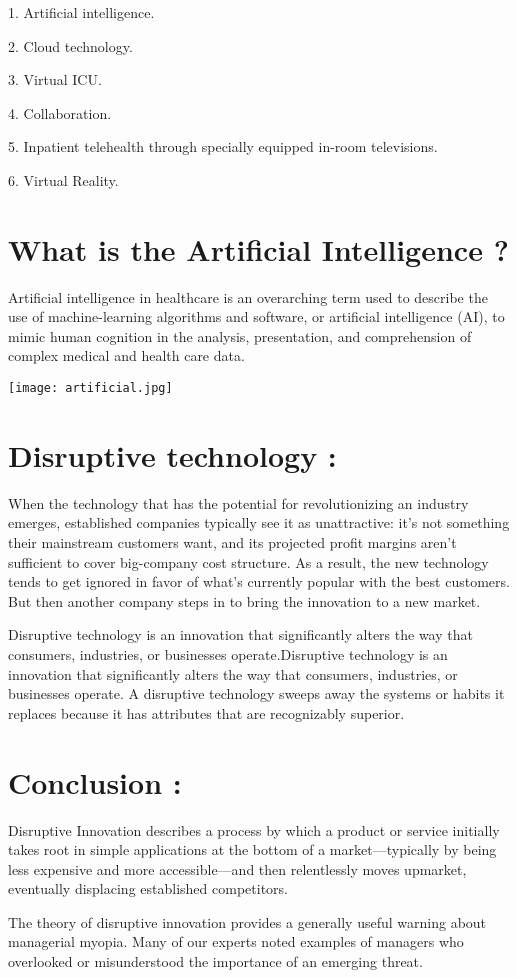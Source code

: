 \documentclass[12pt]{article}
\begin{document}
 1. Artificial intelligence.
 
 
 2. Cloud technology.
 
 
 3. Virtual ICU.
 
 
 4. Collaboration.
 
 
 5. Inpatient telehealth through specially equipped in-room televisions.
 
 
 6. Virtual Reality.
 
\section*{What is the Artificial Intelligence ?}
Artificial intelligence in healthcare is an overarching term used to describe the use of machine-learning algorithms and software, or artificial intelligence (AI), to mimic human cognition in the analysis, presentation, and comprehension of complex medical and health care data.

\centering
\texttt{[image: artificial.jpg]}

\section*{Disruptive technology :}
When the technology that has the potential for revolutionizing an industry emerges, established companies typically see it as unattractive: it’s not something their mainstream customers want, and its projected profit margins aren’t sufficient to cover big-company cost structure. As a result, the new technology tends to get ignored in favor of what’s currently popular with the best customers. But then another company steps in to bring the innovation to a new market.


Disruptive technology is an innovation that significantly alters the way that consumers, industries, or businesses operate.Disruptive technology is an innovation that significantly alters the way that consumers, industries, or businesses operate. A disruptive technology sweeps away the systems or habits it replaces because it has attributes that are recognizably superior.

\section*{Conclusion :}
Disruptive Innovation describes a process by which a product or service initially takes root in simple applications at the bottom of a market—typically by being less expensive and more accessible—and then relentlessly moves upmarket, eventually displacing established competitors.

The theory of disruptive innovation provides a generally useful warning about managerial myopia. Many of our experts noted examples of managers who overlooked or misunderstood the importance of an emerging threat.
\end{document}
